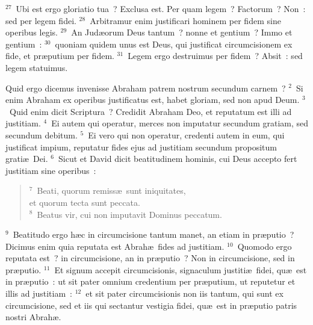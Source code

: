${}^{27}$~Ubi est ergo gloriatio tua~? Exclusa est. Per quam legem~? Factorum~? Non~: sed per legem fidei.
${}^{28}$~Arbitramur enim justificari hominem per fidem sine operibus legis.
${}^{29}$~An Jud\ae orum Deus tantum~? nonne et gentium~? Immo et gentium~:
${}^{30}$~quoniam quidem unus est Deus, qui justificat circumcisionem ex fide, et pr\ae putium per fidem.
${}^{31}$~Legem ergo destruimus per fidem~? Absit~: sed legem statuimus.

\lettrine[lines=3,image=true,loversize=0.05,lraise=-0.03]{Q}{}uid ergo dicemus invenisse Abraham patrem nostrum secundum carnem~?
${}^{2}$~Si enim Abraham ex operibus justificatus est, habet gloriam, sed non apud Deum.
${}^{3}$~Quid enim dicit Scriptura~? Credidit Abraham Deo, et reputatum est illi ad justitiam.
${}^{4}$~Ei autem qui operatur, merces non imputatur secundum gratiam, sed secundum debitum.
${}^{5}$~Ei vero qui non operatur, credenti autem in eum, qui justificat impium, reputatur fides ejus ad justitiam secundum propositum grati\ae\ Dei.
${}^{6}$~Sicut et David dicit beatitudinem hominis, cui Deus accepto fert justitiam sine operibus~:
\begin{flushleft}\begin{verse}${}^{7}$~Beati, quorum remiss\ae\ sunt iniquitates,\\ et quorum tecta sunt peccata.\\
${}^{8}$~Beatus vir, cui non imputavit Dominus peccatum.\end{verse}\end{flushleft}


${}^{9}$~Beatitudo ergo h\ae c in circumcisione tantum manet, an etiam in pr\ae putio~? Dicimus enim quia reputata est Abrah\ae\ fides ad justitiam.
${}^{10}$~Quomodo ergo reputata est~? in circumcisione, an in pr\ae putio~? Non in circumcisione, sed in pr\ae putio.
${}^{11}$~Et signum accepit circumcisionis, signaculum justiti\ae\ fidei, qu\ae\ est in pr\ae putio~: ut sit pater omnium credentium per pr\ae putium, ut reputetur et illis ad justitiam~:
${}^{12}$~et sit pater circumcisionis non iis tantum, qui sunt ex circumcisione, sed et iis qui sectantur vestigia fidei, qu\ae\ est in pr\ae putio patris nostri Abrah\ae .


